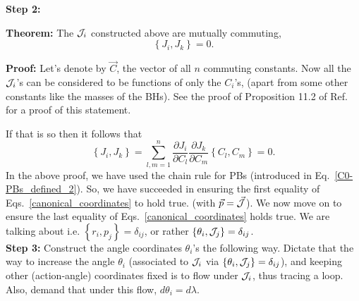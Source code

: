 \newpage


\textbf{Step 2:} 

\textbf{Theorem:} The $\mathcal{J}_i$ constructed above are mutually commuting, 
\begin{equation}
\left\{J_{i}, J_{k}\right\}  =  0.          \label{actions_commute}
\end{equation}


\textbf{Proof:}  
Let's denote by $\vec{C}$, the vector of all $n$ commuting constants.
Now all the $\mathcal{J}_i$'s can be considered to be functions of only the $C_i$'s,
(apart from some other constants like the masses of the BHs).
See the proof of Proposition 11.2 of Ref.~\cite{fasano} for a proof
of this statement.

If that is so then it follows that
\begin{equation}
\left\{J_{i}, J_{k}\right\}=\sum_{l, m=1}^{n} \frac{\partial J_{i}}{\partial C_{l}} \frac{\partial J_{k}}{\partial C_{m}}\left\{C_{l}, C_{m}\right\}=0 . 
\end{equation}
In the above proof, we have used the chain rule for PBs (introduced in
Eq.~\eqref{C0-PBs_defined_2}). So, we have succeeded in ensuring the first equality of Eqs.~\eqref{canonical_coordinates}
to hold true. (with $\vec{p} = \vec{\mathcal{J}}$). We now move on to ensure the last equality of 
Eqs.~\eqref{canonical_coordinates} holds true. We are talking about i.e. $\left\{r_{i}, p_{j}\right\}=\delta_{ij} $,
or rather $\left\{\theta_{i}, \mathcal{J}_{j}\right\} = \delta_{ij}$.   \\




\textbf{Step 3:} Construct the angle coordinates $\theta_i$'s the following way.
Dictate that the way to increase the angle $\theta_i$ (associated to $\mathcal{J}_i$
via $\left\lbrace \theta_i, \mathcal{J}_j \right\rbrace = \delta_{ij}$),
and keeping other (action-angle) coordinates fixed
is to flow under $\mathcal{J}_i$, thus tracing a loop.
Also, demand that under this flow, $d \theta_i = d \lambda$.



